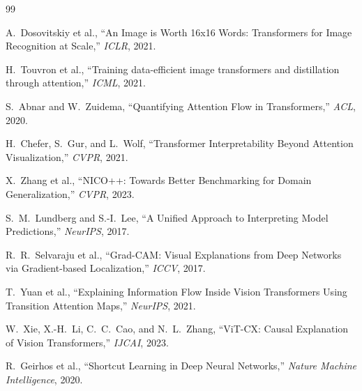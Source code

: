 \documentclass[10pt]{article}
\begin{document}
\begin{thebibliography}{99}\small

A.~Dosovitskiy et al., ``An Image is Worth 16x16 Words: Transformers for Image Recognition at Scale,'' \emph{ICLR}, 2021.

H.~Touvron et al., ``Training data-efficient image transformers and distillation through attention,'' \emph{ICML}, 2021.

S.~Abnar and W.~Zuidema, ``Quantifying Attention Flow in Transformers,'' \emph{ACL}, 2020.

H.~Chefer, S.~Gur, and L.~Wolf, ``Transformer Interpretability Beyond Attention Visualization,'' \emph{CVPR}, 2021.

X.~Zhang et al., ``NICO++: Towards Better Benchmarking for Domain Generalization,'' \emph{CVPR}, 2023.

S.~M.~Lundberg and S.-I.~Lee, ``A Unified Approach to Interpreting Model Predictions,'' \emph{NeurIPS}, 2017.

R.~R.~Selvaraju et al., ``Grad-CAM: Visual Explanations from Deep Networks via Gradient-based Localization,'' \emph{ICCV}, 2017.

T.~Yuan et al., ``Explaining Information Flow Inside Vision Transformers Using Transition Attention Maps,'' \emph{NeurIPS}, 2021.

W.~Xie, X.-H.~Li, C.~C.~Cao, and N.~L.~Zhang, ``ViT-CX: Causal Explanation of Vision Transformers,'' \emph{IJCAI}, 2023.

R.~Geirhos et al., ``Shortcut Learning in Deep Neural Networks,'' \emph{Nature Machine Intelligence}, 2020.

\end{thebibliography}
\end{document}
